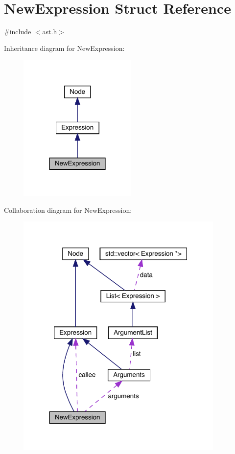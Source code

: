 \hypertarget{struct_new_expression}{}\section{New\+Expression Struct Reference}
\label{struct_new_expression}


{\ttfamily \#include $<$ast.\+h$>$}



Inheritance diagram for New\+Expression\+:
\nopagebreak
\begin{figure}[H]
\begin{center}
\leavevmode
\includegraphics[width=165pt]{struct_new_expression__inherit__graph}
\end{center}
\end{figure}


Collaboration diagram for New\+Expression\+:
\nopagebreak
\begin{figure}[H]
\begin{center}
\leavevmode
\includegraphics[width=290pt]{struct_new_expression__coll__graph}
\end{center}
\end{figure}
